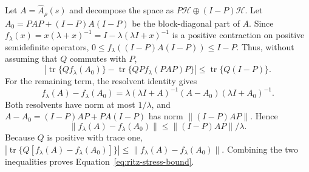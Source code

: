 Let $A=\widehat A_\rho(s)$ and decompose the space as
$P\mathcal H\oplus(I-P)\mathcal H$. Let
$A_0=PAP+(I-P)A(I-P)$ be the block-diagonal part of $A$. Since
$f_\lambda(x)=x(\lambda+x)^{-1}=I-\lambda(\lambda I+x)^{-1}$ is a positive
contraction on positive semidefinite operators,
$0\le f_\lambda((I-P)A(I-P))\le I-P$. Thus, without assuming that $Q$ commutes
with $P$,
\[
\left|
\operatorname{tr}\{Q f_\lambda(A_0)\}
-
\operatorname{tr}\{Q P f_\lambda(PAP)P\}
\right|
\le
\operatorname{tr}\{Q(I-P)\}.
\]
For the remaining term, the resolvent identity gives
\[
f_\lambda(A)-f_\lambda(A_0)
=
\lambda(\lambda I+A)^{-1}(A-A_0)(\lambda I+A_0)^{-1}.
\]
Both resolvents have norm at most $1/\lambda$, and
$A-A_0=(I-P)AP+PA(I-P)$ has norm $\|(I-P)AP\|$. Hence
\[
\|f_\lambda(A)-f_\lambda(A_0)\|
\le
\|(I-P)AP\|/\lambda.
\]
Because $Q$ is positive with trace one,
$|\operatorname{tr}\{Q[f_\lambda(A)-f_\lambda(A_0)]\}|
\le \|f_\lambda(A)-f_\lambda(A_0)\|$. Combining the two inequalities proves
Equation~\eqref{eq:ritz-stress-bound}.
